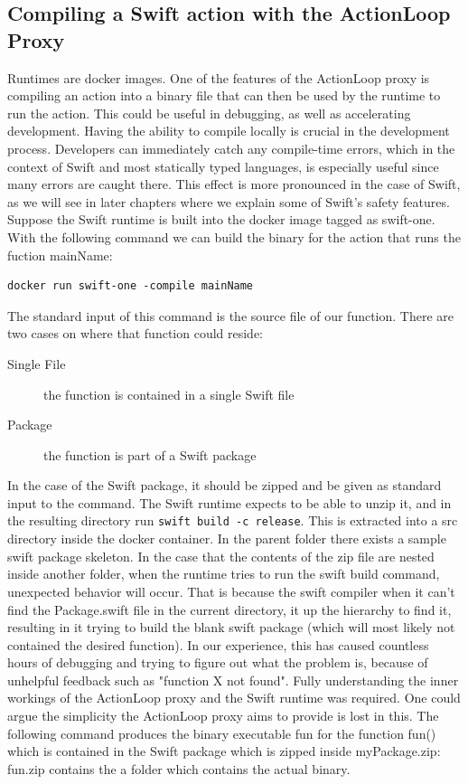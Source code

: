 \subsection{Compiling a Swift action with the ActionLoop Proxy}
Runtimes are docker images. One of the features of the ActionLoop proxy is compiling an action into a binary file that can then be used by the runtime to run the action. This could be useful in debugging, as well as accelerating development.
Having the ability to compile locally is crucial in the development process. Developers can immediately catch any compile-time errors, which in the context of Swift and most statically typed languages, is especially useful since many errors are caught there. This effect is more pronounced in the case of Swift, as we will see in later chapters where we explain some of Swift's safety features.
Suppose the Swift runtime is built into the docker image tagged as swift-one. With the following command we can build the binary for the action that runs the fuction mainName:
\begin{verbatim}
docker run swift-one -compile mainName
\end{verbatim}
The standard input of this command is the source file of our function. There are two cases on where that function could reside:
\begin{description}
	\item [Single File] the function is contained in a single Swift file
	\item [Package] the function is part of a Swift package
\end{description}
In the case of the Swift package, it should be zipped and be given as standard input to the command. The Swift runtime expects to be able to unzip it, and in the resulting directory run \texttt{swift build -c release}. This is extracted into a src directory inside the docker container. In the parent folder there exists a sample swift package skeleton. In the case that the contents of the zip file are nested inside another folder, when the runtime tries to run the swift build command, unexpected behavior will occur. That is because the swift compiler when it can't find the Package.swift file in the current directory, it up the hierarchy to find it, resulting in it trying to build the blank swift package (which will most likely not contained the desired function). In our experience, this has caused countless hours of debugging and trying to figure out what the problem is, because of unhelpful feedback such as "function X not found". Fully understanding the inner workings of the ActionLoop proxy and the Swift runtime was required. One could argue the simplicity the ActionLoop proxy aims to provide is lost in this.
The following command produces the binary executable fun for the function fun() which is contained in the Swift package which is zipped inside myPackage.zip:
fun.zip contains the a folder which contains the actual binary.


